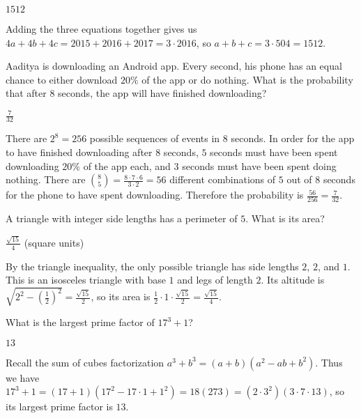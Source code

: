 \documentclass[11pt]{article}
\begin{document}
\begin{answer}
$\boxed{1512}$
\end{answer}

\begin{solution}
Adding the three equations together gives us $4a + 4b + 4c = 2015 + 2016 + 2017 = 3 \cdot 2016$, so $a+b+c = 3 \cdot 504 = \boxed{1512}$.
\end{solution}

\begin{problem}%
Aaditya is downloading an Android app. Every second, his phone has an equal chance to either download $20\%$ of the app or do nothing. What is the probability that after $8$ seconds, the app will have finished downloading?
\end{problem}

\begin{answer}
$\boxed{\frac{7}{32}}$
\end{answer}

\begin{solution}
There are $2^8 = 256$ possible sequences of events in $8$ seconds. In order for the app to have finished downloading after $8$ seconds, $5$ seconds must have been spent downloading $20\%$ of the app each, and $3$ seconds must have been spent doing nothing. There are $\binom{8}{5} = \frac{8 \cdot 7 \cdot 6}{3 \cdot 2} = 56$ different combinations of $5$ out of $8$ seconds for the phone to have spent downloading. Therefore the probability is $\frac{56}{256} = \boxed{\frac{7}{32}}$.
\end{solution}


\begin{problem}
A triangle with integer side lengths has a perimeter of $5$. What is its area?
\end{problem}

\begin{answer}
$\boxed{\frac{\sqrt{15}}{4}}$ (square units)
\end{answer}

\begin{solution}
By the triangle inequality, the only possible triangle has side lengths $2$, $2$, and $1$. This is an isosceles triangle with base $1$ and legs of length $2$. Its altitude is $\sqrt{2^2 - \left(\frac{1}{2}\right)^2} = \frac{\sqrt{15}}{2}$, so its area is $\frac{1}{2} \cdot 1 \cdot \frac{\sqrt{15}}{2} = \boxed{\frac{\sqrt{15}}{4}}$.
\end{solution}


\begin{problem}%
What is the largest prime factor of $17^3 + 1$?
\end{problem}

\begin{answer}
$\boxed{13}$
\end{answer}

\begin{solution}
Recall the sum of cubes factorization $a^3 + b^3 = (a+b)(a^2 - ab + b^2)$. Thus we have $17^3 + 1 = (17+1)(17^2 - 17\cdot 1 + 1^2) = 18(273) = (2 \cdot 3^2)(3 \cdot 7 \cdot 13)$, so its largest prime factor is $\boxed{13}$.
\end{solution}
\end{document}
